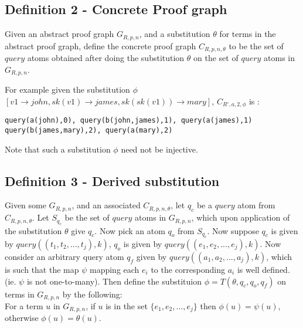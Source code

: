 \documentclass{article}
\begin{document}
\subsection{Definition 2 - Concrete Proof graph}
Given an abstract proof graph $G_{R,p,n}$, and a substitution $\theta$ for terms in the abstract proof graph, define the concrete proof graph $C_{R,p,n,\theta}$ to be the set of $query$ atoms obtained after doing the substitution $\theta$ on the set of $query$ atoms in $G_{R,p,n}$. 

For example given the substitution $\phi$ $[v1\rightarrow john, sk(v1) \rightarrow james, sk(sk(v1))\rightarrow mary]$, $C_{R',a,2,\phi}$ is : \begin{verbatim}
query(a(john),0), query(b(john,james),1), query(a(james),1)
query(b(james,mary),2), query(a(mary),2) \end{verbatim}
Note that such a substitution $\phi$ need not be injective.
\subsection{Definition 3 - Derived substitution}
Given some $G_{R,p,n}$, and an associated $C_{R,p,n,\theta}$, let $q_{c}$ be a $query$ atom from $C_{R,p,n,\theta}$. Let $S_{q_{c}}$ be the set of $query$ atoms in $G_{R,p,n}$, which upon application of the substitution $\theta$ give $q_{c}$. Now pick an atom $q_{o}$ from $S_{q_{c}}$. Now suppose $q_{c}$ is given by $query((t_{1},t_{2},...,t_{j}),k)$, $q_{o}$ is given by $query((e_{1},e_{2},...,e_{j}),k)$. Now consider an arbitrary query atom $q_{f}$ given by $query((a_{1},a_{2},...,a_{j}),k)$, which is such that the map $\psi$ mapping each $e_{i}$ to the corresponding $a_{i}$ is well defined. (ie. $\psi$ is not one-to-many). Then define the substituion $\phi = T(\theta, q_{c},q_{o},q_{f})$ on terms in $G_{R,p,n}$ by the following:\\ For a term $u$ in $G_{R,p,n}$, if $u$ is in the set $\{e_{1},e_{2},...,e_{j}\}$ then $\phi(u) = \psi(u)$, otherwise $\phi(u) = \theta(u)$.
\end{document}
